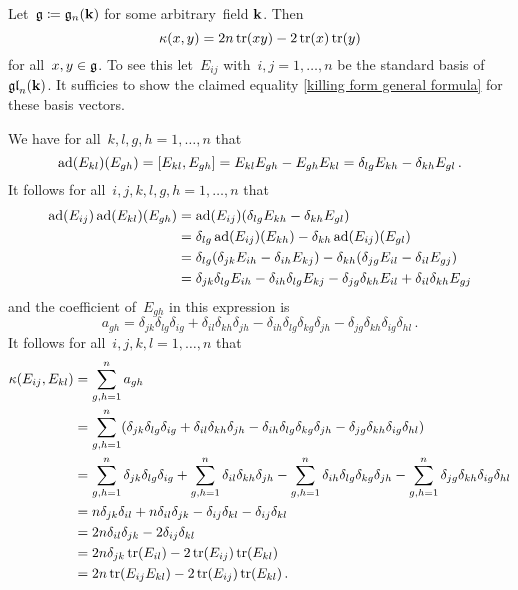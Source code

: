 \begin{example}
  \label{killing form of gln}
  Let~$\mathfrak{g} \coloneqq \mathfrak{g}_n(\mathbf{k})$ for some arbitrary~field $\mathbf{k}$.
  Then
  \begin{equation}
    \label{killing form general formula}
    \kappa(x,y)
    =
    2n\operatorname{tr}(xy) - 2\operatorname{tr}(x)\operatorname{tr}(y)
  \end{equation}
  for all~$x, y \in \mathfrak{g}$.
  To see this let~$E_{ij}$ with~$i,j = 1, \dotsc, n$ be the standard basis of~$\mathfrak{gl}_n(\mathbf{k})$.
  It sufficies to show the claimed equality \eqref{killing form general formula} for these basis vectors.
  
  We have for all~$k,l,g,h = 1, \dotsc, n$ that
  \[
    \operatorname{ad}(E_{kl})(E_{gh})
    =
    [E_{kl}, E_{gh}]
    =
    E_{kl} E_{gh} - E_{gh} E_{kl}
    =
    \delta_{lg} E_{kh} - \delta_{kh} E_{gl} \,.
  \]
  It follows for all~$i,j,k,l,g,h = 1, \dotsc, n$ that
  \begin{align*}
    \operatorname{ad}(E_{ij})\operatorname{ad}(E_{kl})(E_{gh})
    &=
    \operatorname{ad}(E_{ij})(\delta_{lg} E_{kh}
    - \delta_{kh} E_{gl})
    \\
    &=
    \delta_{lg} \operatorname{ad}(E_{ij})(E_{kh})
    - \delta_{kh} \operatorname{ad}(E_{ij})(E_{gl})
    \\
    &=
      \delta_{lg}(\delta_{jk} E_{ih}
    - \delta_{ih} E_{kj})
    - \delta_{kh}(\delta_{jg} E_{il}
    - \delta_{il} E_{gj})
    \\
    &=
      \delta_{jk} \delta_{lg} E_{ih}
    - \delta_{ih} \delta_{lg} E_{kj}
    - \delta_{jg} \delta_{kh} E_{il}
    + \delta_{il} \delta_{kh} E_{gj}
  \end{align*}
  and the coefficient of~$E_{gh}$ in this expression is
  \[
    a_{gh}
    =
      \delta_{jk} \delta_{lg} \delta_{ig}
    + \delta_{il} \delta_{kh} \delta_{jh}
    - \delta_{ih} \delta_{lg} \delta_{kg} \delta_{jh}
    - \delta_{jg} \delta_{kh} \delta_{ig} \delta_{hl} \,.
  \]
  It follows for all~$i,j,k,l = 1, \dotsc, n$ that
  \begin{align*}
    \kappa(E_{ij}, E_{kl})
    &=
    \sum_{g,h=1}^n a_{gh}
    \\
    &=
    \sum_{g,h=1}^n
    (
        \delta_{jk} \delta_{lg} \delta_{ig}
      + \delta_{il} \delta_{kh} \delta_{jh}
      - \delta_{ih} \delta_{lg} \delta_{kg} \delta_{jh}
      - \delta_{jg} \delta_{kh} \delta_{ig} \delta_{hl}
    )
    \\
    &=
      \sum_{g,h=1}^n \delta_{jk} \delta_{lg} \delta_{ig}
    + \sum_{g,h=1}^n \delta_{il} \delta_{kh} \delta_{jh}
    - \sum_{g,h=1}^n \delta_{ih} \delta_{lg} \delta_{kg} \delta_{jh}
    - \sum_{g,h=1}^n \delta_{jg} \delta_{kh} \delta_{ig} \delta_{hl}
    \\
    &=
      n \delta_{jk} \delta_{il}
    + n \delta_{il} \delta_{jk}
    - \delta_{ij} \delta_{kl}
    - \delta_{ij} \delta_{kl}
    \\
    &=
      2 n \delta_{il} \delta_{jk}
    - 2 \delta_{ij} \delta_{kl}
    \\
    &=
    2n \delta_{jk} \operatorname{tr}(E_{il})  - 2 \operatorname{tr}(E_{ij}) \operatorname{tr}(E_{kl})
    \\
    &=
    2n \operatorname{tr}(E_{ij} E_{kl}) - 2 \operatorname{tr}(E_{ij}) \operatorname{tr}(E_{kl}) \,.
  \end{align*}
\end{example}


